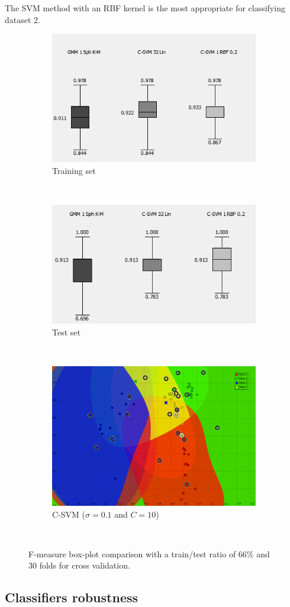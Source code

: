 \documentclass[a4paper,10pt]{article}
\begin{document}
The SVM method with an RBF kernel is the most appropriate for classifying dataset 2.\\

\begin{figure}[H]
\centering
	\begin{subfigure}[t]{0.3\textwidth} \label{fig:best-GMM}
      \centering
      \includegraphics[height=3.2 cm]{pictures/Compare-best-classification-training}
      \caption{Training set}
      \label{fig:Compare-best-classification-training}
    \end{subfigure}%
    ~
    \begin{subfigure}[t]{0.3\textwidth} \label{fig:best-SVM}
      \centering
      \includegraphics[height=3.2 cm]{pictures/Compare-best-classification-test}
      \caption{Test set}
      \label{fig:Compare-best-classification-training}
     \end{subfigure}
      ~
    \begin{subfigure}[t]{0.3\textwidth} \label{fig:best-C-SVM}
      \centering
      \includegraphics[height= 3.2 cm]{pictures/classification-best.png}
      \caption{C-SVM ($\sigma = 0.1$ and $C=10$)}
      \label{fig:classification-best}
     \end{subfigure}
      ~
     \caption{F-measure box-plot comparison with a train/test ratio of 66\% and 30 folds for cross validation.}
\end{figure}


\subsection{Classifiers robustness} 
\label{sec:classifier_robustness}
\end{document}
